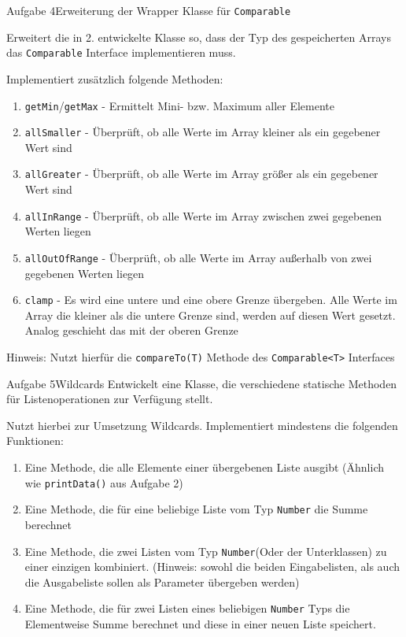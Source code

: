 \begin{frame}[allowframebreaks]{Aufgabe 4}{Erweiterung der Wrapper Klasse für \texttt{Comparable}}

    Erweitert die in 2. entwickelte Klasse so, dass der Typ des gespeicherten Arrays das \texttt{Comparable} Interface implementieren muss.

    Implementiert zusätzlich folgende Methoden:
    \begin{enumerate}
        \item \texttt{getMin}/\texttt{getMax} - Ermittelt Mini- bzw. Maximum aller Elemente
        \item \texttt{allSmaller} - Überprüft, ob alle Werte im Array kleiner als ein gegebener Wert sind
        \item \texttt{allGreater} - Überprüft, ob alle Werte im Array größer als ein gegebener Wert sind
        \item \texttt{allInRange} - Überprüft, ob alle Werte im Array zwischen zwei gegebenen Werten liegen
        \item \texttt{allOutOfRange} - Überprüft, ob alle Werte im Array außerhalb von zwei gegebenen Werten liegen
        \item \texttt{clamp} - Es wird eine untere und eine obere Grenze übergeben. Alle Werte im Array die kleiner als die untere Grenze sind, werden auf diesen Wert gesetzt. Analog geschieht das mit der oberen Grenze
    \end{enumerate}

    Hinweis: Nutzt hierfür die \texttt{compareTo(T)} Methode des \texttt{Comparable<T>} Interfaces
\end{frame}

\begin{frame}[allowframebreaks]{Aufgabe 5}{Wildcards}
Entwickelt eine Klasse, die verschiedene statische Methoden für Listenoperationen zur Verfügung stellt. 

Nutzt hierbei zur Umsetzung Wildcards.
Implementiert mindestens die folgenden Funktionen:

\begin{enumerate}
    \item Eine Methode, die alle Elemente einer übergebenen Liste ausgibt (Ähnlich wie \texttt{printData()} aus Aufgabe 2)
    \item Eine Methode, die für eine beliebige Liste vom Typ \texttt{Number} die Summe berechnet
    \item Eine Methode, die zwei Listen vom Typ \texttt{Number}(Oder der Unterklassen) zu einer einzigen kombiniert. (Hinweis: sowohl die beiden Eingabelisten, 
    als auch die Ausgabeliste sollen als Parameter übergeben werden)
    \item Eine Methode, die für zwei Listen eines beliebigen \texttt{Number} Typs die Elementweise Summe berechnet und diese in einer neuen Liste speichert.
\end{enumerate}
\end{frame}